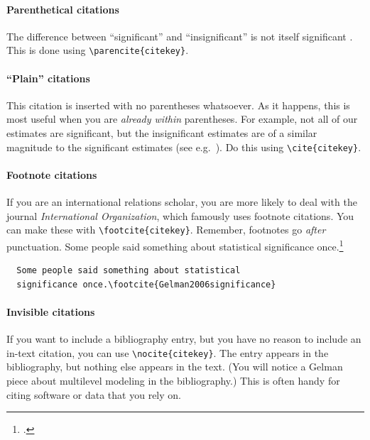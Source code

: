 \documentclass[12pt
              ]{article}
\begin{document}
\paragraph{Parenthetical citations} 
The difference between ``significant'' and ``insignificant'' is not itself significant \parencite{Gelman2006significance}. This is done using \verb+\parencite{citekey}+.

\paragraph{``Plain'' citations} 
This citation is inserted with no parentheses whatsoever. As it happens, this is most useful when you are \emph{already within} parentheses. For example, not all of our estimates are significant, but the insignificant estimates are of a similar magnitude to the significant estimates (see e.g.\ \cite{Gelman2006significance}). Do this using \verb+\cite{citekey}+.



\paragraph{Footnote citations}
If you are an international relations scholar, you are more likely to deal with the journal \emph{International Organization}, which famously uses footnote citations. You can make these with \verb+\footcite{citekey}+. Remember, footnotes go \emph{after} punctuation. Some people said something about statistical significance once.\footcite{Gelman2006significance}
\newline
\begin{minipage}{\linewidth}
\begin{lstlisting}
  Some people said something about statistical 
  significance once.\footcite{Gelman2006significance}
\end{lstlisting}
\end{minipage}


\paragraph{Invisible citations}
If you want to include a bibliography entry, but you have no reason to include an in-text citation, you can use \verb+\nocite{citekey}+. The entry appears in the bibliography, but nothing else appears in the text. (You will notice a Gelman piece about multilevel modeling in the bibliography.) This is often handy for citing software or data that you rely on. \nocite{Gelman2006multilevel}
\end{document}
